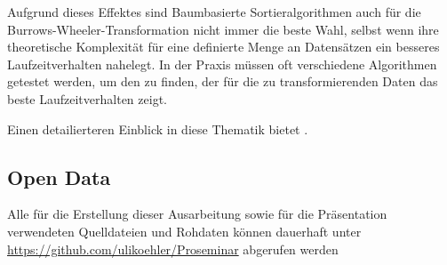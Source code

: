 \documentclass[ngerman,pdftex,paper=A4,DIV=calc,titlepage,12pt]{scrartcl}
\newtheorem[L]{boxedDefinition}{Definition}
\begin{document}
Aufgrund dieses Effektes sind Baumbasierte Sortieralgorithmen auch für die Burrows-Wheeler-Transformation nicht immer die beste Wahl, selbst wenn ihre theoretische Komplexität für eine definierte Menge an Datensätzen ein besseres Laufzeitverhalten nahelegt. In der Praxis müssen oft verschiedene Algorithmen getestet werden, um den zu finden, der für die zu transformierenden Daten das beste Laufzeitverhalten zeigt.

Einen detailierteren Einblick in diese Thematik bietet \cite{Drepper2007}.

\renewcommand\refname{Literatur- und Quellenverzeichnis}


\subsection*{Open Data}\label{opendata}
Alle für die Erstellung dieser Ausarbeitung sowie für die Präsentation verwendeten Quelldateien und Rohdaten können dauerhaft unter \url{https://github.com/ulikoehler/Proseminar} abgerufen werden
\end{document}
